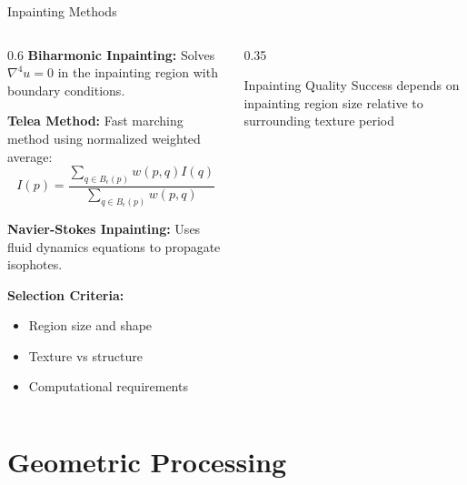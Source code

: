 \documentclass[aspectratio=169,10pt]{beamer}
\begin{document}
\begin{frame}{Inpainting Methods}
    \begin{columns}[T]
        \begin{column}{0.6\textwidth}
            \textbf{Biharmonic Inpainting:}
            Solves $\nabla^4 u = 0$ in the inpainting region with boundary conditions.

            \textbf{Telea Method:}
            Fast marching method using normalized weighted average:
            $$I(p) = \frac{\sum_{q \in B_\epsilon(p)} w(p,q) I(q)}{\sum_{q \in B_\epsilon(p)} w(p,q)}$$

            \textbf{Navier-Stokes Inpainting:}
            Uses fluid dynamics equations to propagate isophotes.

            \textbf{Selection Criteria:}
            \begin{itemize}
                \item Region size and shape
                \item Texture vs structure
                \item Computational requirements
            \end{itemize}
        \end{column}
        \begin{column}{0.35\textwidth}
            \begin{keypoint}{Inpainting Quality}{}
                Success depends on inpainting region size relative to surrounding texture period
            \end{keypoint}
        \end{column}
    \end{columns}
\end{frame}

\section{Geometric Processing}
\end{document}
